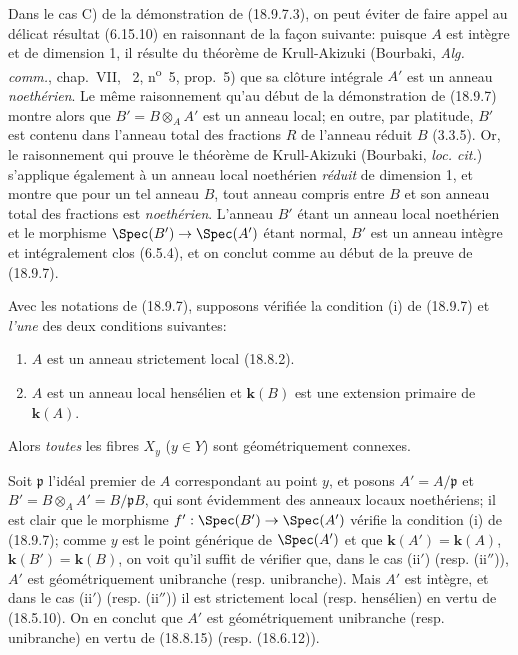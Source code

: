 \begin{remark}[18.9.7.8]
\label{IV.18.9.7.8}
Dans le cas C) de la démonstration de (18.9.7.3), on peut éviter de faire appel au délicat résultat (6.15.10) en raisonnant de la façon suivante: puisque $A$ est intègre et de dimension 1, il résulte du théorème de Krull-Akizuki (Bourbaki, \emph{Alg. comm.}, chap.~VII, \textsection~2, n\textsuperscript{o}~5, prop.~5) que sa clôture intégrale $A'$ est un anneau \emph{noethérien}. Le même raisonnement qu'au début de la démonstration de (18.9.7) montre alors que $B'=B\otimes_A A'$ est un anneau local; en outre, par platitude, $B'$ est contenu dans l'anneau total des fractions $R$ de l'anneau réduit $B$ (3.3.5). Or, le raisonnement qui prouve le théorème de Krull-Akizuki (Bourbaki, \emph{loc. cit.}) s'applique également à un anneau local noethérien \emph{réduit} de dimension 1, et montre que pour un tel anneau $B$, tout anneau compris entre $B$ et son anneau total des fractions est \emph{noethérien}. L'anneau $B'$ étant un anneau local noethérien et le morphisme $\Spec(B')\to\Spec(A')$ étant normal, $B'$ est un anneau intègre et intégralement clos (6.5.4), et on conclut comme au début de la preuve de (18.9.7).
\end{remark}

\begin{corollary}[18.9.8]
\label{IV.18.9.8}
Avec les notations de \textup{(18.9.7)}, supposons vérifiée la condition \textup{(i)} de \textup{(18.9.7)} et \emph{l'une} des deux conditions suivantes:
\begin{enumerate}
  \item[\textup{(ii$'$)}] $A$ est un anneau strictement local \textup{(18.8.2)}.
  \item[\textup{(ii$''$)}] $A$ est un anneau local hensélien et $\boldsymbol{k}(B)$ est une extension primaire de $\boldsymbol{k}(A)$.
\end{enumerate}

Alors \emph{toutes} les fibres $X_y$ \textup{($y\in Y$)} sont géométriquement connexes.
\end{corollary}

Soit $\mathfrak p$ l'idéal premier de $A$ correspondant au point $y$, et posons $A'=A/\mathfrak p$ et $B'=B\otimes_A A'=B/\mathfrak pB$, qui sont évidemment des anneaux locaux noethériens; il est clair que le morphisme $f':\Spec(B')\to\Spec(A')$ vérifie la condition (i) de (18.9.7); comme $y$ est le point générique de $\Spec(A')$ et que $\boldsymbol{k}(A')=\boldsymbol{k}(A)$, $\boldsymbol{k}(B')=\boldsymbol{k}(B)$, on voit qu'il suffit de vérifier que, dans le cas (ii$'$) (resp. (ii$''$)), $A'$ est géométriquement unibranche (resp. unibranche). Mais $A'$ est intègre, et dans le cas (ii$'$) (resp. (ii$''$)) il est strictement local (resp. hensélien) en vertu de (18.5.10). On en conclut que $A'$ est géométriquement unibranche (resp. unibranche) en vertu de (18.8.15) (resp. (18.6.12)).

